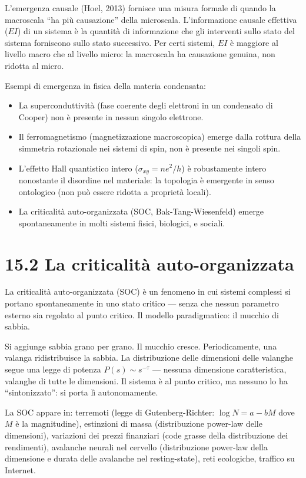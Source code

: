 \documentclass[11.5pt,a4paper,openany]{book}
\theoremstyle{remark}
\begin{document}
L'emergenza causale (Hoel, 2013) fornisce una misura formale di quando la macroscala ``ha più causazione'' della microscala. L'informazione causale effettiva ($EI$) di un sistema è la quantità di informazione che gli interventi sullo stato del sistema forniscono sullo stato successivo. Per certi sistemi, $EI$ è maggiore al livello macro che al livello micro: la macroscala ha causazione genuina, non ridotta al micro.

Esempi di emergenza in fisica della materia condensata:
\begin{itemize}
\item La superconduttività (fase coerente degli elettroni in un condensato di Cooper) non è presente in nessun singolo elettrone.
\item Il ferromagnetismo (magnetizzazione macroscopica) emerge dalla rottura della simmetria rotazionale nei sistemi di spin, non è presente nei singoli spin.
\item L'effetto Hall quantistico intero ($\sigma_{xy} = ne^2/h$) è robustamente intero nonostante il disordine nel materiale: la topologia è emergente in senso ontologico (non può essere ridotta a proprietà locali).
\item La criticalità auto-organizzata (SOC, Bak-Tang-Wiesenfeld) emerge spontaneamente in molti sistemi fisici, biologici, e sociali.
\end{itemize}

\section{15.2 La criticalità auto-organizzata}

La criticalità auto-organizzata (SOC) è un fenomeno in cui sistemi complessi si portano spontaneamente in uno stato critico --- senza che nessun parametro esterno sia regolato al punto critico. Il modello paradigmatico: il mucchio di sabbia.

Si aggiunge sabbia grano per grano. Il mucchio cresce. Periodicamente, una valanga ridistribuisce la sabbia. La distribuzione delle dimensioni delle valanghe segue una legge di potenza $P(s) \sim s^{-\tau}$ --- nessuna dimensione caratteristica, valanghe di tutte le dimensioni. Il sistema è al punto critico, ma nessuno lo ha ``sintonizzato'': si porta lì autonomamente.

La SOC appare in: terremoti (legge di Gutenberg-Richter: $\log N = a - bM$ dove $M$ è la magnitudine), estinzioni di massa (distribuzione power-law delle dimensioni), variazioni dei prezzi finanziari (code grasse della distribuzione dei rendimenti), avalanche neurali nel cervello (distribuzione power-law della dimensione e durata delle avalanche nel resting-state), reti ecologiche, traffico su Internet.
\end{document}
